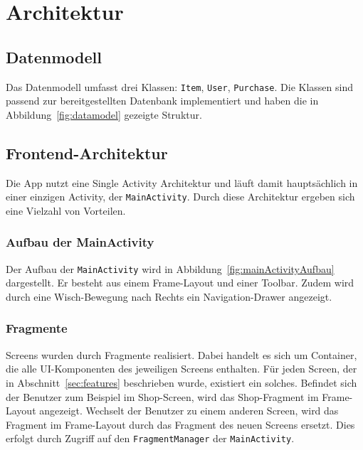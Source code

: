\section{Architektur}\label{sec:architecture}

\subsection{Datenmodell}\label{subsec:datamodel}

Das Datenmodell umfasst drei Klassen: \texttt{Item}, \texttt{User}, \texttt{Purchase}.
Die Klassen sind passend zur bereitgestellten Datenbank implementiert und haben die in Abbildung~\ref{fig:datamodel} gezeigte Struktur.


\subsection{Frontend-Architektur}\label{subsec:frontend}

Die App nutzt eine Single Activity Architektur und läuft damit hauptsächlich in einer einzigen Activity, der \texttt{MainActivity}.
Durch diese Architektur ergeben sich eine Vielzahl von Vorteilen.

\subsubsection{Aufbau der MainActivity}

Der Aufbau der \texttt{MainActivity} wird in Abbildung~\ref{fig:mainActivityAufbau} dargestellt.
Er besteht aus einem Frame-Layout und einer Toolbar.
Zudem wird durch eine Wisch-Bewegung nach Rechts ein Navigation-Drawer angezeigt.

\subsubsection{Fragmente}

Screens wurden durch Fragmente realisiert.
Dabei handelt es sich um Container, die alle UI-Komponenten des jeweiligen Screens enthalten.
Für jeden Screen, der in Abschnitt~\ref{sec:features} beschrieben wurde, existiert ein solches.
Befindet sich der Benutzer zum Beispiel im Shop-Screen, wird das Shop-Fragment im Frame-Layout angezeigt.
Wechselt der Benutzer zu einem anderen Screen, wird das Fragment im Frame-Layout durch das Fragment des neuen Screens ersetzt.
Dies erfolgt durch Zugriff auf den \texttt{FragmentManager} der \texttt{MainActivity}.

